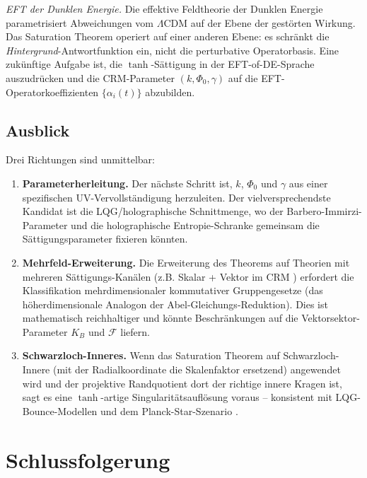 \documentclass[aps,prd,twocolumn,superscriptaddress,nofootinbib]{revtex4-2}
\begin{document}
\textit{EFT der Dunklen Energie.} Die effektive Feldtheorie der Dunklen Energie \cite{Gubitosi2013} parametrisiert Abweichungen vom $\Lambda$CDM auf der Ebene der gestörten Wirkung. Das Saturation Theorem operiert auf einer anderen Ebene: es schränkt die \textit{Hintergrund}-Antwortfunktion ein, nicht die perturbative Operatorbasis. Eine zukünftige Aufgabe ist, die $\tanh$-Sättigung in der EFT-of-DE-Sprache auszudrücken und die CRM-Parameter $(k, \Phi_0, \gamma)$ auf die EFT-Operatorkoeffizienten $\{\alpha_i(t)\}$ abzubilden.

\subsection{Ausblick}

Drei Richtungen sind unmittelbar:

\begin{enumerate}
\item \textbf{Parameterherleitung.} Der nächste Schritt ist, $k$, $\Phi_0$ und $\gamma$ aus einer spezifischen UV-Vervollständigung herzuleiten. Der vielversprechendste Kandidat ist die LQG/holographische Schnittmenge, wo der Barbero-Immirzi-Parameter und die holographische Entropie-Schranke gemeinsam die Sättigungsparameter fixieren könnten.

\item \textbf{Mehrfeld-Erweiterung.} Die Erweiterung des Theorems auf Theorien mit mehreren Sättigungs-Kanälen (z.B. Skalar + Vektor im CRM \cite{Geiger2026d}) erfordert die Klassifikation mehrdimensionaler kommutativer Gruppengesetze (das höherdimensionale Analogon der Abel-Gleichungs-Reduktion). Dies ist mathematisch reichhaltiger und könnte Beschränkungen auf die Vektorsektor-Parameter $K_B$ und $\mathcal{F}$ liefern.

\item \textbf{Schwarzloch-Inneres.} Wenn das Saturation Theorem auf Schwarzloch-Innere (mit der Radialkoordinate die Skalenfaktor ersetzend) angewendet wird und der projektive Randquotient dort der richtige innere Kragen ist, sagt es eine $\tanh$-artige Singularitätsauflösung voraus -- konsistent mit LQG-Bounce-Modellen \cite{Ashtekar2006} und dem Planck-Star-Szenario \cite{Rovelli2014}.
\end{enumerate}


\section{Schlussfolgerung}
\label{sec:conclusion}
\end{document}
